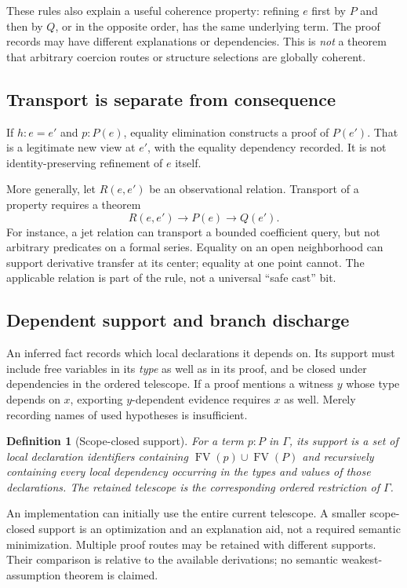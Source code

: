 \documentclass[11pt,letterpaper]{article}
\newcommand{\FV}{\operatorname{FV}}
\newtheorem{definition}{Definition}[section]
\theoremstyle{remark}
\begin{document}
These rules also explain a useful coherence property: refining $e$ first by
$P$ and then by $Q$, or in the opposite order, has the same underlying term.
The proof records may have different explanations or dependencies. This is
\emph{not} a theorem that arbitrary coercion routes or structure selections
are globally coherent.

\subsection{Transport is separate from consequence}
If $h:e=e'$ and $p:P(e)$, equality elimination constructs a proof of $P(e')$.
That is a legitimate new view at $e'$, with the equality dependency recorded.
It is not identity-preserving refinement of $e$ itself.

More generally, let $R(e,e')$ be an observational relation. Transport of a
property requires a theorem
\[
  R(e,e')\to P(e)\to Q(e').
\]
For instance, a jet relation can transport a bounded coefficient query, but
not arbitrary predicates on a formal series. Equality on an open neighborhood
can support derivative transfer at its center; equality at one point cannot.
The applicable relation is part of the rule, not a universal ``safe cast'' bit.

\subsection{Dependent support and branch discharge}\label{sec:support}
An inferred fact records which local declarations it depends on. Its support
must include free variables in its \emph{type} as well as in its proof, and be
closed under dependencies in the ordered telescope. If a proof mentions a
witness $y$ whose type depends on $x$, exporting $y$-dependent evidence requires
$x$ as well. Merely recording names of used hypotheses is insufficient.

\begin{definition}[Scope-closed support]
For a term $p:P$ in $\Gamma$, its support is a set of local declaration
identifiers containing $\FV(p)\cup\FV(P)$ and recursively containing every
local dependency occurring in the types and values of those declarations.
The retained telescope is the corresponding ordered restriction of $\Gamma$.
\end{definition}

An implementation can initially use the entire current telescope. A smaller
scope-closed support is an optimization and an explanation aid, not a required
semantic minimization. Multiple proof routes may be retained with different
supports. Their comparison is relative to the available derivations; no
semantic weakest-assumption theorem is claimed.
\end{document}
